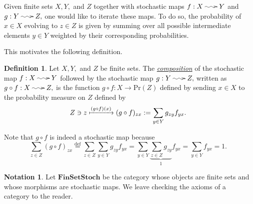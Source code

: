 \documentclass[12pt]{article}
\makeatletter
\theoremstyle{theorem}
\theoremstyle{definition}
\newtheorem{definition}[equation]{Definition}
\newtheorem{notation}[equation]{Notation}
\numberwithin{equation}{section}
\newcommand{\be}{\begin{equation}}
\newcommand{\ee}{\end{equation}}
\newcommand{\bd}{\begin{definition}}
\newcommand{\ed}{\end{definition}}
\newcommand{\<}{\langle}
\renewcommand{\>}{\rangle}
\newcommand{\FinSetStoch}{\mathbf{FinSetStoch}}
\newcommand{\stoch}{\;\xy0;/r.25pc/:\ar@{~>}(3,0);(-3,0);\endxy\;}
\makeatother
\begin{document}
Given finite sets $X, Y,$ and $Z$
together with stochastic maps $f : X \stoch Y$ and $g : Y \stoch Z,$ 
one would like to iterate these maps. To do so, the probability
of $x\in X$ evolving to $z\in Z$ is given by summing over all 
possible intermediate elements $y\in Y$ weighted by their corresponding
probabilities. 
\begin{center}
\end{center}
This motivates the following definition. 

\bd
Let $X, Y,$ and $Z$ be finite sets.
The \emph{\uline{composition}} of the
stochastic map $f : X \stoch Y$ followed by the stochastic map $g : Y \stoch Z,$ 
written as $g \circ f : X \stoch Z,$ is the function
$g \circ f : X \to \mathrm{Pr}(Z)$
defined by sending $x\in X$ to the probability
measure on $Z$ defined by
\be
\begin{split}
Z \ni z \xmapsto{(g\circ f)(x)} (g\circ f)_{zx}
:= \sum_{y\in Y}g_{zy}f_{yx}.
\end{split}
\ee
\ed

Note that $g\circ f$ is indeed a stochastic map because 
\be
\sum_{z \in Z} (g\circ f)_{zx}
\overset{\text{def}}{=}\sum_{z \in Z}\sum_{y\in Y}g_{zy}f_{yx}
=\sum_{y\in Y}\underbrace{\sum_{z \in Z}g_{zy}}_{1}f_{yx}
=\sum_{y\in Y}f_{yx}
=1.
\ee



\begin{notation}
\label{not:finstochandfinsetstoch}
Let $\FinSetStoch$ be the category whose objects are
finite sets and whose morphisms are stochastic maps. 
We leave checking the axioms of a category to the reader. 
\end{notation}
\end{document}
